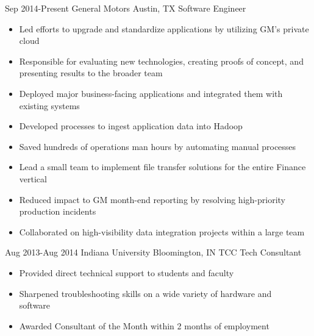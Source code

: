 \documentclass[]{friggeri-cv} %
\begin{document}
 \begin{entrylist}
   \entry
     {Sep 2014-Present}
     {General Motors}
     {Austin, TX}
     {Software Engineer}
     {\begin{itemize}
         \item Led efforts to upgrade and standardize applications by utilizing GM's private cloud
         \item Responsible for evaluating new technologies, creating proofs of concept, and presenting results to the broader team 
         \item Deployed major business-facing applications and integrated them with existing systems
         \item Developed processes to ingest application data into Hadoop
         \item Saved hundreds of operations man hours by automating manual processes
         \item Lead a small team to implement file transfer solutions for the entire Finance vertical
         \item Reduced impact to GM month-end reporting by resolving high-priority production incidents
         \item Collaborated on high-visibility data integration projects within a large team
         

     \end{itemize}}
   \entry
     {Aug 2013-Aug 2014}
     {Indiana University}
     {Bloomington, IN}
     {TCC Tech Consultant}
     {\begin{itemize}
        \item Provided direct technical support to students and faculty
        \item Sharpened troubleshooting skills on a wide variety of hardware and \\software
        \item Awarded Consultant of the Month within 2 months of employment
     \end{itemize}
     }
 \end{entrylist}
\end{document}
